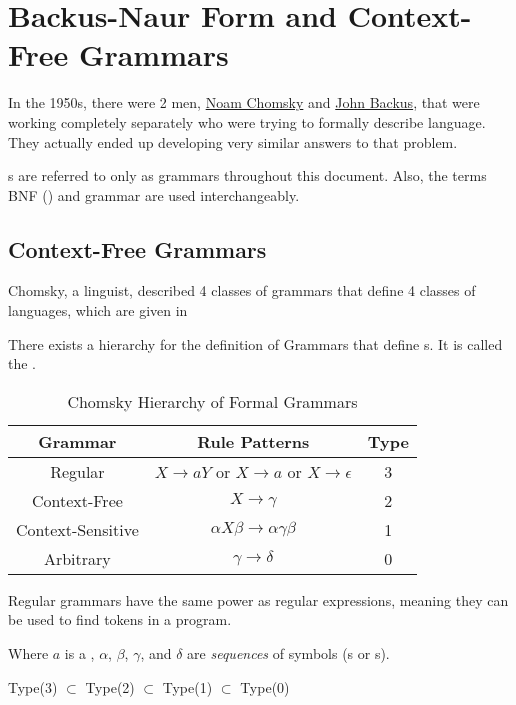 \section{Backus-Naur Form and Context-Free Grammars}\label{sec:BNF_and_CFGs}
In the 1950s, there were 2 men, \href{https://en.wikipedia.org/wiki/Noam_Chomsky}{Noam Chomsky} and \href{https://en.wikipedia.org/wiki/John_Backus}{John Backus}, that were working completely separately who were trying to formally describe language.
They actually ended up developing very similar answers to that problem.

\begin{remark*}
  s are referred to only as grammars throughout this document.
  Also, the terms BNF () and grammar are used interchangeably.
\end{remark*}

\subsection{Context-Free Grammars}\label{subsec:CFGs}
Chomsky, a linguist, described 4 classes of grammars that define 4 classes of languages, which are given in 

There exists a hierarchy for the definition of Grammars that define s.
It is called the \emph{}.
\begin{table}[h!]
  \centering
  \begin{tabular}{ccc}
    \toprule
    Grammar & Rule Patterns & Type \\
    \midrule
    Regular & $X \rightarrow a Y$ or $X \rightarrow a$ or $X \rightarrow \epsilon$ & 3 \\
    Context-Free & $X \rightarrow \gamma$ & 2 \\
    Context-Sensitive & $\alpha X \beta \rightarrow \alpha \gamma \beta$ & 1 \\
    Arbitrary & $\gamma \rightarrow \delta$ & 0 \\
    \bottomrule
  \end{tabular}
  \caption{Chomsky Hierarchy of Formal Grammars}
  \label{tab:Formal_Grammar_Hierarchy}
\end{table}

Regular grammars have the same power as regular expressions, meaning they can be used to find tokens in a program.

\begin{remark*}
  Where $a$ is a , $\alpha$, $\beta$, $\gamma$, and $\delta$ are \emph{sequences} of symbols (s or s).

  Type(3) $\subset$ Type(2) $\subset$ Type(1) $\subset$ Type(0)
\end{remark*}

